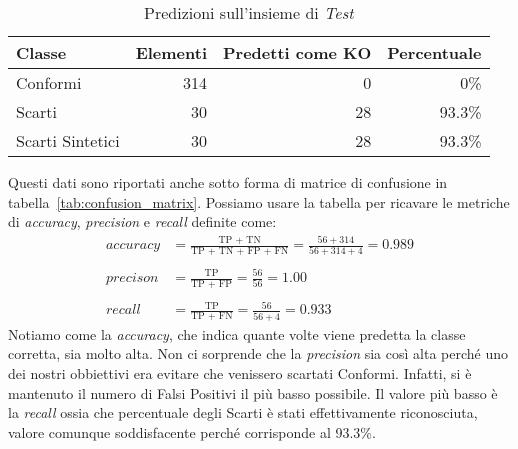\begin{table}[ht]
  \centering
  \begin{tabular}{||l r r r||}
    \hline
    Classe           & Elementi & Predetti come KO & Percentuale \\ \hline \hline
    Conformi         & 314      & 0                & 0\%         \\ \hline
    Scarti           & 30       & 28               & 93.3\%      \\ \hline
    Scarti Sintetici & 30       & 28               & 93.3\%      \\ \hline

  \end{tabular}
  \caption{Predizioni sull'insieme di \textit{Test}}
  \label{tab:test_predicions}
\end{table}

Questi dati sono riportati anche sotto forma di matrice di confusione in tabella~\ref{tab:confusion_matrix}.
Possiamo usare la tabella per ricavare le metriche di \textit{accuracy}, \textit{precision} e \textit{recall} definite come:
\begin{align*} %
  accuracy &= \frac{\text{TP + TN}}{\text{TP + TN + FP + FN}}
            = \frac{56 + 314}{56 + 314 + 4} = 0.989
  \\ \\
  precison &= \frac{\text{TP}}{\text{TP + FP}} 
            = \frac{56}{56} = 1.00
  \\ \\
  recall   &= \frac{\text{TP}}{\text{TP + FN}} 
            = \frac{56}{56 + 4} = 0.933
\end{align*}
Notiamo come la \textit{accuracy}, che indica quante volte viene predetta la classe corretta, sia molto alta.
Non ci sorprende che la \textit{precision} sia così alta perché uno dei nostri obbiettivi era evitare che venissero scartati Conformi.
Infatti, si è mantenuto il numero di Falsi Positivi il più basso possibile.
Il valore più basso è la \textit{recall} ossia che percentuale degli Scarti è stati effettivamente riconosciuta, valore comunque soddisfacente perché corrisponde al 93.3\%.

